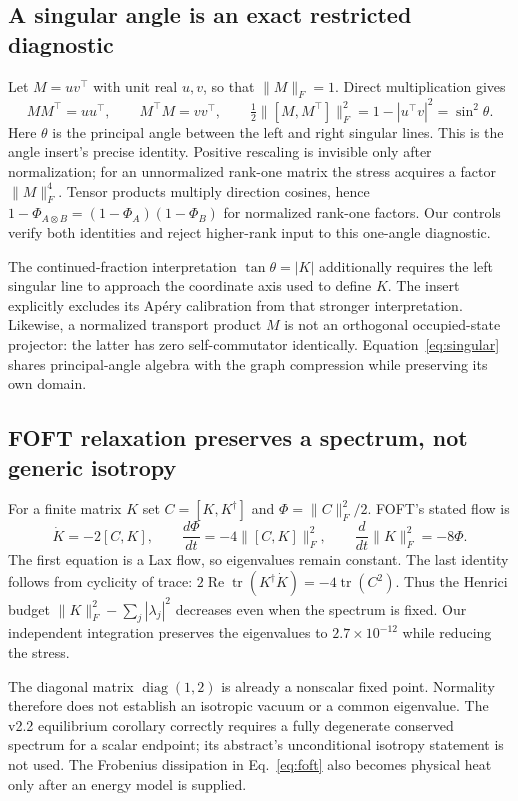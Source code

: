 \documentclass[11pt]{article}
\newcommand{\tr}{\operatorname{tr}}
\begin{document}
\subsection{A singular angle is an exact restricted diagnostic}
Let $M=uv^\top$ with unit real $u,v$, so that $\|M\|_F=1$. Direct multiplication gives
\begin{equation}
MM^\top=uu^\top,\qquad M^\top M=vv^\top,\qquad
\tfrac12\|[M,M^\top]\|_F^2=1-|u^\top v|^2=\sin^2\theta.
\label{eq:singular}
\end{equation}
Here $\theta$ is the principal angle between the left and right singular lines. This is the angle insert's precise identity. Positive rescaling is invisible only after normalization; for an unnormalized rank-one matrix the stress acquires a factor $\|M\|_F^4$. Tensor products multiply direction cosines, hence $1-\Phi_{A\otimes B}=(1-\Phi_A)(1-\Phi_B)$ for normalized rank-one factors. Our controls verify both identities and reject higher-rank input to this one-angle diagnostic.

The continued-fraction interpretation $\tan\theta=|K|$ additionally requires the left singular line to approach the coordinate axis used to define $K$. The insert explicitly excludes its Ap\'ery calibration from that stronger interpretation. Likewise, a normalized transport product $M$ is not an orthogonal occupied-state projector: the latter has zero self-commutator identically. Equation~\eqref{eq:singular} shares principal-angle algebra with the graph compression while preserving its own domain.

\subsection{FOFT relaxation preserves a spectrum, not generic isotropy}
For a finite matrix $K$ set $C=[K,K^\dagger]$ and $\Phi=\|C\|_F^2/2$. FOFT's stated flow is
\begin{equation}
\dot K=-2[C,K],\qquad
\frac{d\Phi}{dt}=-4\|[C,K]\|_F^2,\qquad
\frac{d}{dt}\|K\|_F^2=-8\Phi.
\label{eq:foft}
\end{equation}
The first equation is a Lax flow, so eigenvalues remain constant. The last identity follows from cyclicity of trace: $2\operatorname{Re}\tr(K^\dagger\dot K)=-4\tr(C^2)$. Thus the Henrici budget $\|K\|_F^2-\sum_j|\lambda_j|^2$ decreases even when the spectrum is fixed. Our independent integration preserves the eigenvalues to $2.7\times10^{-12}$ while reducing the stress.

The diagonal matrix $\operatorname{diag}(1,2)$ is already a nonscalar fixed point. Normality therefore does not establish an isotropic vacuum or a common eigenvalue. The v2.2 equilibrium corollary correctly requires a fully degenerate conserved spectrum for a scalar endpoint; its abstract's unconditional isotropy statement is not used. The Frobenius dissipation in Eq.~\eqref{eq:foft} also becomes physical heat only after an energy model is supplied.
\end{document}
